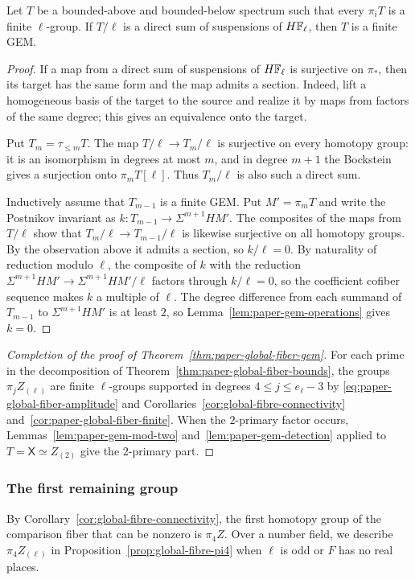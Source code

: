 \begin{lemma}\label{lem:paper-gem-detection}
Let $T$ be a bounded-above and bounded-below spectrum such that every $\pi_iT$ is a finite $\ell$-group.
If $T/\ell$ is a direct sum of suspensions of $H\mathbb F_\ell$, then $T$ is a finite GEM.
\end{lemma}
\begin{proof}
If a map from a direct sum of suspensions of $H\mathbb F_\ell$ is surjective on $\pi_*$, then its target has the same form and the map admits a section.
Indeed, lift a homogeneous basis of the target to the source and realize it by maps from factors of the same degree; this gives an equivalence onto the target.

Put $T_m=\tau_{\le m}T$.
The map $T/\ell\to T_m/\ell$ is surjective on every homotopy group: it is an isomorphism in degrees at most $m$, and in degree $m+1$ the Bockstein gives a surjection onto $\pi_mT[\ell]$.
Thus $T_m/\ell$ is also such a direct sum.

Inductively assume that $T_{m-1}$ is a finite GEM.
Put $M'=\pi_mT$ and write the Postnikov invariant as $k:T_{m-1}\to\Sigma^{m+1}HM'$.
The composites of the maps from $T/\ell$ show that $T_m/\ell\to T_{m-1}/\ell$ is likewise surjective on all homotopy groups.
By the observation above it admits a section, so $k/\ell=0$.
By naturality of reduction modulo $\ell$, the composite of $k$ with the reduction $\Sigma^{m+1}HM'\to\Sigma^{m+1}HM'/\ell$ factors through $k/\ell=0$, so the coefficient cofiber sequence makes $k$ a multiple of $\ell$.
The degree difference from each summand of $T_{m-1}$ to $\Sigma^{m+1}HM'$ is at least $2$, so Lemma~\ref{lem:paper-gem-operations} gives $k=0$.
\end{proof}

\begin{proof}[Completion of the proof of Theorem~\ref{thm:paper-global-fiber-gem}]
For each prime in the decomposition of Theorem~\ref{thm:paper-global-fiber-bounds}, the groups $\pi_jZ_{(\ell)}$ are finite $\ell$-groups supported in degrees $4\le j\le e_\ell-3$ by \eqref{eq:paper-global-fiber-amplitude} and Corollaries~\ref{cor:global-fibre-connectivity} and~\ref{cor:paper-global-fiber-finite}.
When the $2$-primary factor occurs, Lemmas~\ref{lem:paper-gem-mod-two} and~\ref{lem:paper-gem-detection} applied to $T=\mathsf X\simeq Z_{(2)}$ give the $2$-primary part.
\end{proof}

\subsubsection{The first remaining group}
By Corollary~\ref{cor:global-fibre-connectivity}, the first homotopy group of the comparison fiber that can be nonzero is $\pi_4Z$.
Over a number field, we describe $\pi_4Z_{(\ell)}$ in Proposition~\ref{prop:global-fibre-pi4} when $\ell$ is odd or $F$ has no real places.


